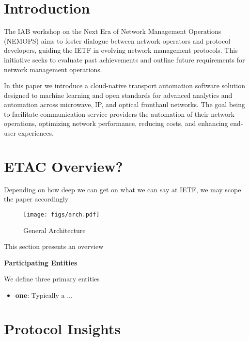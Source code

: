 \documentclass[11pt,sigconf]{iabart}
\begin{document}

\maketitle

\section{Introduction} \label{introduction}

The IAB workshop on the Next Era of Network Management Operations (NEMOPS) aims to foster dialogue between network operators and protocol developers, guiding the IETF in evolving network management protocols. This initiative seeks to evaluate past achievements and outline future requirements for network management operations.

In this paper we introduce a cloud-native transport automation software solution designed to machine learning and open standards for advanced analytics and automation across microwave, IP, and optical fronthaul networks. The goal being to facilitate communication service providers the automation of their network operations, optimizing network performance, reducing costs, and enhancing end-user experiences.


\section{ETAC Overview?} \label{overview}

Depending on how deep we can get on what we can say at IETF, we may scope the paper accordingly

\begin{figure}[h]
  \centering
  \texttt{[image: figs/arch.pdf]}
  \caption{General Architecture}
  \label{fig:overall_architecture}
\end{figure}


This section presents an overview

\textbf{Participating Entities}

We define three primary entities

\begin{itemize}
  \item \textbf{one}: Typically a ...
\end{itemize}


\section{Protocol Insights} \label{insights}
\end{document}
